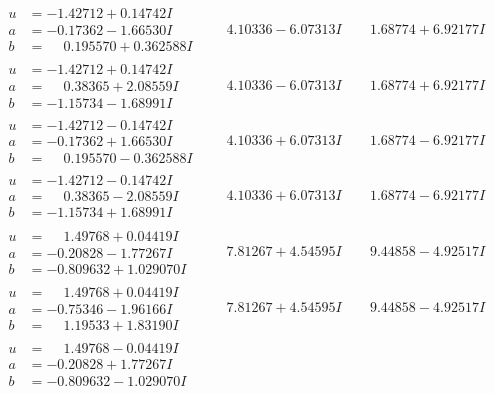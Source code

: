 \documentclass[1p]{elsarticle_modified}
\theoremstyle{definition}
\begin{document}
$$\begin{array}{c|c|c}
\begin{aligned}
u &= -1.42712 + 0.14742 I \\
a &= -0.17362 - 1.66530 I \\
b &= \phantom{-}0.195570 + 0.362588 I\end{aligned}
 & \phantom{-}4.10336 - 6.07313 I & \phantom{-}1.68774 + 6.92177 I \\ \hline\begin{aligned}
u &= -1.42712 + 0.14742 I \\
a &= \phantom{-}0.38365 + 2.08559 I \\
b &= -1.15734 - 1.68991 I\end{aligned}
 & \phantom{-}4.10336 - 6.07313 I & \phantom{-}1.68774 + 6.92177 I \\ \hline\begin{aligned}
u &= -1.42712 - 0.14742 I \\
a &= -0.17362 + 1.66530 I \\
b &= \phantom{-}0.195570 - 0.362588 I\end{aligned}
 & \phantom{-}4.10336 + 6.07313 I & \phantom{-}1.68774 - 6.92177 I \\ \hline\begin{aligned}
u &= -1.42712 - 0.14742 I \\
a &= \phantom{-}0.38365 - 2.08559 I \\
b &= -1.15734 + 1.68991 I\end{aligned}
 & \phantom{-}4.10336 + 6.07313 I & \phantom{-}1.68774 - 6.92177 I \\ \hline\begin{aligned}
u &= \phantom{-}1.49768 + 0.04419 I \\
a &= -0.20828 - 1.77267 I \\
b &= -0.809632 + 1.029070 I\end{aligned}
 & \phantom{-}7.81267 + 4.54595 I & \phantom{-}9.44858 - 4.92517 I \\ \hline\begin{aligned}
u &= \phantom{-}1.49768 + 0.04419 I \\
a &= -0.75346 - 1.96166 I \\
b &= \phantom{-}1.19533 + 1.83190 I\end{aligned}
 & \phantom{-}7.81267 + 4.54595 I & \phantom{-}9.44858 - 4.92517 I \\ \hline\begin{aligned}
u &= \phantom{-}1.49768 - 0.04419 I \\
a &= -0.20828 + 1.77267 I \\
b &= -0.809632 - 1.029070 I\end{aligned}

\end{array}$$
\end{document}
